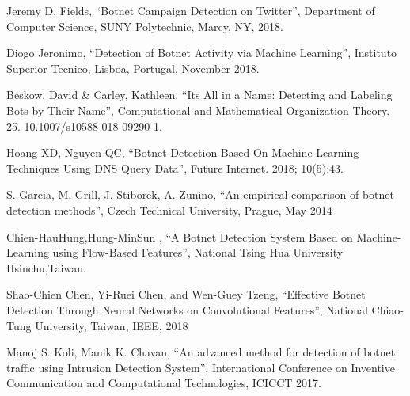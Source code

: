 \documentclass[a4paper, 12pt]{article}
\begin{document}
\begin{thebibliography}{21}
  Jeremy D. Fields, “Botnet Campaign Detection on Twitter”, Department of Computer Science, SUNY Polytechnic, Marcy, NY, 2018.

 Diogo Jeronimo, “Detection of Botnet Activity via Machine Learning”, Instituto Superior Tecnico, Lisboa, Portugal, November 2018.

  Beskow, David & Carley, Kathleen, “Its All in a Name: Detecting and Labeling Bots by Their Name”,  Computational and Mathematical Organization Theory. 25. 10.1007/s10588-018-09290-1.


  Hoang XD, Nguyen QC, “Botnet Detection Based On Machine Learning Techniques Using DNS Query Data”, Future Internet. 2018; 10(5):43.


 S. Garcia, M. Grill, J. Stiborek, A. Zunino, “An empirical comparison of botnet detection methods”, Czech Technical University, Prague, May 2014


 Chien-HauHung,Hung-MinSun , “A Botnet Detection System Based on Machine-Learning using Flow-Based Features”, National Tsing Hua University Hsinchu,Taiwan.


Shao-Chien Chen, Yi-Ruei Chen, and Wen-Guey Tzeng, “Effective Botnet Detection Through Neural Networks on Convolutional Features”, National Chiao-Tung University, Taiwan, IEEE, 2018

Manoj S. Koli, Manik K. Chavan, “An advanced method for detection of botnet traffic using Intrusion Detection System”, International Conference on Inventive Communication and Computational Technologies, ICICCT 2017.

\end{thebibliography}
\end{document}
